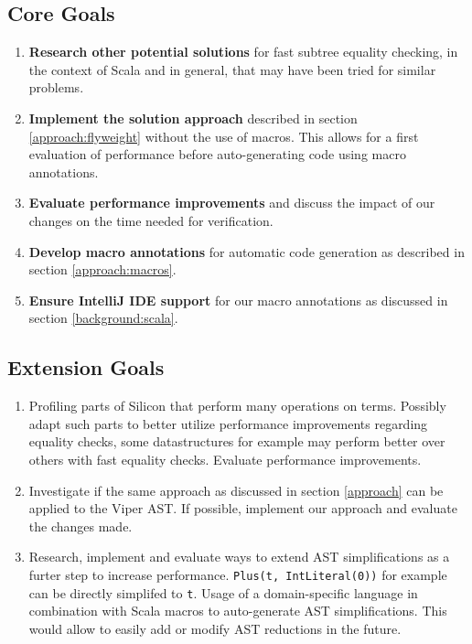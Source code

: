 \documentclass[11pt]{article}
\begin{document}
    \subsection{Core Goals}
    \begin{enumerate}
        \item \textbf{Research other potential solutions} for fast subtree equality checking, in the context of Scala
        and in general, that may have been tried for similar problems.
        \item \textbf{Implement the solution approach} described in section
        \ref{approach:flyweight} without the use of macros. This allows for a first
        evaluation of performance before auto-generating code using macro
        annotations.
        \item \textbf{Evaluate performance improvements} and discuss
        the impact of our changes on the time needed for verification.
        \item \textbf{Develop macro annotations} for automatic code generation as
        described in section \ref{approach:macros}.
        \item \textbf{Ensure IntelliJ IDE support} for our macro annotations as
        discussed in section \ref{background:scala}.
    \end{enumerate}
    \subsection{Extension Goals}
    \begin{enumerate}
        \item Profiling parts of Silicon that perform many operations on
        terms. Possibly adapt such parts to better utilize performance improvements
        regarding equality checks, some datastructures for example may perform better
        over others with fast equality checks. Evaluate performance improvements.
        \item Investigate if the same approach as discussed in
        section \ref{approach} can be applied to the Viper AST.
        If possible, implement our approach and evaluate the changes made.
        \item Research, implement and evaluate ways to extend AST simplifications as a furter step to increase performance.
        \texttt{Plus(t, IntLiteral(0))} for example can be directly simplifed to \texttt{t}.
        Usage of a domain-specific language in combination with Scala macros to auto-generate AST
        simplifications. This would allow to easily add or modify
        AST reductions in the future. 

    \end{enumerate}

    \printbibliography
    
\end{document}
